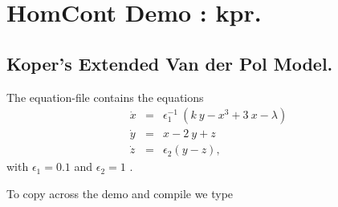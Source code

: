 \documentclass[12pt]{report}
\def\eps{\epsilon}
\begin{document}
\chapter{ {\cal HomCont} Demo : kpr.} \label{ch:HomCont_kpr}

\section{ Koper's Extended Van der Pol Model.}
%
The equation-file  contains the equations
\begin{equation} \label{ko} \begin{array}{rcl}
\dot{x} & = & \eps_1^{-1}\:(k\: y - x^3 +3\:x - \lambda) \\
\dot{y} & = & x - 2\: y + z \\
\dot{z} & = & \eps_2(y-z), 
\end{array} \end{equation}
with $\eps_1 =0.1$ and $\eps_2=1$ \cite{Ko:95}.

To copy across the demo  and compile we type
\begin{center}
 \\
\end{center}
\end{document}
